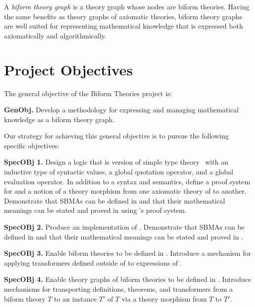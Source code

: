 \documentclass[fleqn]{llncs}
\begin{document}
A \emph{biform theory graph} is a theory graph whose nodes are biform
theories. Having the same benefits as theory graphs of axiomatic
theories, biform theory graphs are well suited for representing
mathematical knowledge that is expressed both axiomatically and
algorithmically.
  
\section{Project Objectives}

The general objective of the Biform Theories project is:

\bi

  \item[] \textbf{GenObj.} Develop a methodology for expressing and
    managing mathematical knowledge as a biform theory graph.

\ei

\noindent
Our strategy for achieving this general objective is to pursue the
following specific objectives:

\bi

  \item[]\textbf{SpecOBj 1.} Design a logic  that is
    version of simple type theory~\cite{Farmer08} with an inductive
    type of syntactic values, a global quotation operator, and a
    global evaluation operator.  In addition to a syntax and
    semantics, define a proof system for  and a notion of a
    theory morphism from one axiomatic theory of  to
    another.  Demonstrate that SBMAs can be defined in  and
    that their mathematical meanings can be stated and proved in using
    's proof system.

\medskip

  \item[]\textbf{SpecOBj 2.} Produce an implementation  of
    .  Demonstrate that SBMAs can be defined in
     and that their mathematical meanings can be stated
    and proved in .

\medskip

  \item[]\textbf{SpecOBj 3.} Enable biform theories to be defined in
    .  Introduce a mechanism for applying transformers
    defined outside of  to expressions of .

\medskip

  \item[]\textbf{SpecOBj 4.} Enable theory graphs of biform theories
    to be defined in .  Introduce mechanisms for
    transporting definitions, theorems, and transformers from a biform
    theory $T$ to an instance $T'$ of $T$ via a theory morphism from
    $T$ to $T'$.
\end{document}
